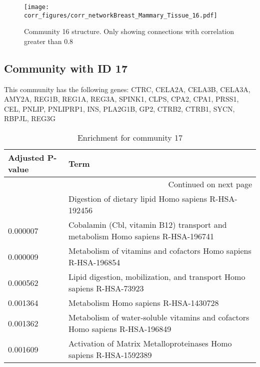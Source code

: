 \begin{figure}[h!]
\centering
\texttt{[image: corr\_figures/corr\_networkBreast\_Mammary\_Tissue\_16.pdf]}
\caption{Community 16 structure. Only showing connections with correlation greater than 0.8}
\end{figure}




\subsection*{Community with ID 17}
This community has the following genes: CTRC, CELA2A, CELA3B, CELA3A, AMY2A, REG1B, REG1A, REG3A, SPINK1, CLPS, CPA2, CPA1, PRSS1, CEL, PNLIP, PNLIPRP1, INS, PLA2G1B, GP2, CTRB2, CTRB1, SYCN, RBPJL, REG3G
\\
\begin{longtable}{p{2.4cm}p{14.5cm}}
\caption{Enrichment for community 17}\\
\toprule
Adjusted \newline P-value &                                                                             Term \\
\midrule
\endhead
\midrule
\multicolumn{2}{r}{{Continued on next page}} \\
\midrule
\endfoot

\bottomrule
\endlastfoot
                 0.000006 &                             Digestion of dietary lipid Homo sapiens R-HSA-192456 \\
                 0.000007 &  Cobalamin (Cbl, vitamin B12) transport and metabolism Homo sapiens R-HSA-196741 \\
                 0.000009 &                   Metabolism of vitamins and cofactors Homo sapiens R-HSA-196854 \\
                 0.000562 &            Lipid digestion, mobilization, and transport Homo sapiens R-HSA-73923 \\
                 0.001364 &                                            Metabolism Homo sapiens R-HSA-1430728 \\
                 0.001362 &     Metabolism of water-soluble vitamins and cofactors Homo sapiens R-HSA-196849 \\
                 0.001609 &               Activation of Matrix Metalloproteinases Homo sapiens R-HSA-1592389 \\
\end{longtable}



